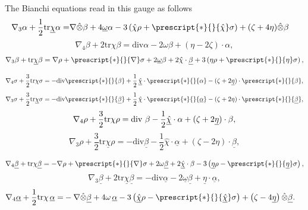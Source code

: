 \documentclass{amsart}
\newcommand{\hsp}{\hspace{.5mm}}
\newcommand{\omegabar}{\underline{\omega}}
\newcommand{\chihat}{\hat{\chi}}
\newcommand{\chibar}{\underline{\chi}}
\newcommand{\chibarhat}{\underline{\hat{\chi}}}
\newcommand{\alphabar}{\underline{\alpha}}
\newcommand{\betabar}{\underline{\beta}}
\newcommand{\etabar}{\underline{\eta}}
\newcommand{\Hodge}[1]{\prescript{*}{}{#1}}
\renewcommand{\div}{\mbox{div }}
\newcommand{\tr}{\mbox{tr}}
\begin{document}
The Bianchi equations read in this gauge as follows
\begin{equation}
	    \begin{split}
	        \nabla_3 \alpha + \frac{1}{2}\tr\chibar \alpha = &\nabla \hat{\otimes}\beta + 4 \omegabar \alpha - 3\left(\chihat \rho + \Hodge{\chihat} \sigma \right)+ (\zeta+4\eta)\hat{\otimes}\beta 
	    \end{split}
	\end{equation}
	\begin{equation}
	        \nabla_4 \beta + 2 \tr\chi \beta = \text{div} \alpha -2 \omega \beta + \left(\eta - 2 \zeta\right)\cdot \alpha,
	\end{equation}
	\begin{equation}
	    \nabla_3 \beta + \tr\chibar \beta = \nabla \rho+ \Hodge{\nabla}\sigma + 2\omegabar \beta +2 \chihat \cdot \betabar + 3 \left(\eta \rho+ \Hodge{\eta}\sigma \right),
	\end{equation}
	
	\begin{equation}
	    \nabla_4 \sigma + \frac{3}{2} \tr\chi \sigma = - \text{div} \Hodge{\beta} + \frac{1}{2}\hsp \chibarhat \cdot \Hodge{\alpha} - (\zeta+2 \etabar) \cdot \Hodge{\beta},
	\end{equation}
	\begin{equation}
	    \nabla_3 \sigma + \frac{3}{2}\tr\chibar \sigma = -\text{div}\Hodge{\betabar} + \frac{1}{2}\hsp\chihat \cdot \Hodge{\alphabar} -(\zeta + 2\eta)\cdot \Hodge{\betabar},
	\end{equation}
	\begin{equation}
	    \nabla_4 \rho + \frac{3}{2}\tr\chi \rho = \text{\div}\beta - \frac{1}{2}\chibarhat \cdot \alpha + (\zeta + 2\etabar) \cdot \beta, 
	\end{equation}
	\begin{equation}
	    \nabla_3 \rho + \frac{3}{2}\tr\chibar \rho = -\text{div}\betabar - \frac{1}{2}\chihat \cdot \alphabar +(\zeta-2\eta)\cdot \betabar, 
	\end{equation}
	
	\begin{equation}
	    \nabla_4 \betabar + \tr\chi \betabar = -\nabla \rho + \Hodge{\nabla} \sigma + 2 \omega \betabar + 2\chibarhat \cdot \beta -3\left(\etabar \rho - \Hodge{\etabar}\sigma \right), 
	\end{equation}
	\begin{equation}
	    \nabla_3 \betabar + 2 \tr\chibar \betabar = -\text{div}\alphabar -2 \omegabar \betabar + \etabar\cdot\alphabar,
	\end{equation}
	\begin{equation}
	    \begin{split}
	        \nabla_4 \alphabar + \frac{1}{2}\tr\chi \hsp \alphabar = &-\nabla \hat{\otimes}\betabar +4 \omega\hsp \alphabar -3\left(\chibarhat \rho - \Hodge{\chibarhat}\sigma \right) +\left(\zeta - 4\etabar\right)\hat{\otimes}\betabar.
	    \end{split}
	\end{equation}
\end{document}
